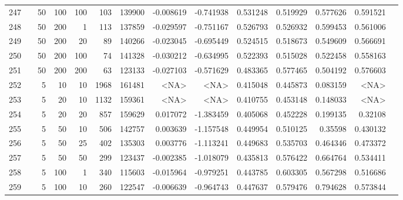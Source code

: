 \begin{longtable}{llrrrrrrrrrrrr}
		247 & &           50 &               100 &          100 &         103 &     139900 & -0.008619 & -0.741938 &  0.531248 &    0.519929 &       0.577626 &  0.591521 \\
		248 & &           50 &               200 &            1 &         113 &     137859 & -0.029597 & -0.751167 &  0.526793 &    0.526932 &       0.599453 &  0.561006 \\
		249 & &           50 &               200 &           20 &          89 &     140266 & -0.023045 & -0.695449 &  0.524515 &    0.518673 &       0.549609 &  0.566691 \\
		250 & &           50 &               200 &          100 &          74 &     141328 & -0.030212 & -0.634995 &  0.522393 &    0.515028 &       0.522458 &  0.558163 \\
		251 & &           50 &               200 &          200 &          63 &     123133 & -0.027103 & -0.571629 &  0.483365 &    0.577465 &       0.504192 &  0.576603 \\\midrule
		252 & \multirow[t]{74}{*}{\rotatebox[origin=r]{90}{sbert-tf-idf-weighted}} &            5 &                10 &           10 &        1968 &     161481 &      <NA> &      <NA> &  0.415048 &    0.445873 &       0.083159 &  <NA> \\
		253 & &            5 &                20 &           10 &           1132 &     159361 &      <NA> &      <NA> &  0.410755 &    0.453148 &       0.148033 &  <NA> \\
		254 & &            5 &                20 &           20 &         857 &     159629 &  0.017072 & -1.383459 &  0.405068 &    0.452228 &       0.199135 &   0.32108 \\
		255 & &            5 &                50 &           10 &         506 &     142757 &  0.003639 & -1.157548 &  0.449954 &    0.510125 &        0.35598 &  0.430132 \\
		256 & &            5 &                50 &           25 &         402 &     135303 &  0.003776 & -1.113241 &  0.449683 &    0.535703 &       0.464346 &  0.473372 \\
		257 & &            5 &                50 &           50 &         299 &     123437 & -0.002385 & -1.018079 &  0.435813 &    0.576422 &       0.664764 &  0.534411 \\
		258 & &            5 &               100 &            1 &         340 &     115603 & -0.015964 & -0.979251 &  0.443785 &    0.603305 &       0.567298 &  0.516686 \\
		259 & &            5 &               100 &           10 &         260 &     122547 & -0.006639 & -0.964743 &  0.447637 &    0.579476 &       0.794628 &  0.573844 \\

\end{longtable}
